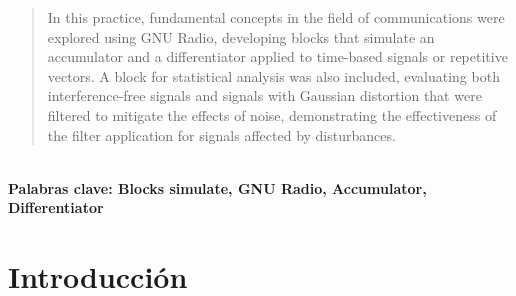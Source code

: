 \documentclass{journal}[IEEEtran, twocolumn]
\begin{document}
\begin{multicols}{2}
\begin{abstract}
    In this practice, fundamental concepts in the field of communications were explored using GNU Radio, developing blocks that simulate an accumulator and a differentiator applied to time-based signals or repetitive vectors. A block for statistical analysis was also included, evaluating both interference-free signals and signals with Gaussian distortion that were filtered to mitigate the effects of noise, demonstrating the effectiveness of the filter application for signals affected by disturbances. 
\end{abstract}\\  
 \textbf{Palabras clave: Blocks simulate, GNU Radio, Accumulator, Differentiator } \color{black}
 \\


\section{Introducción}


\end{multicols}
\end{document}
